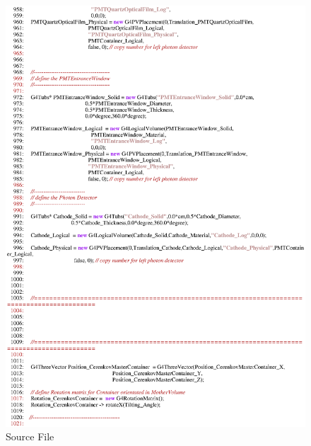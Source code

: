 \begin{figure}[ht]
  \hspace{0cm}
  \includegraphics[scale=0.8]{./figures5/QweakSimCerenkovDetector.cc-p16.eps}
  \caption{\label{SourceV16} Source File}
           \label{fig:V-SC-20}
\end{figure}
\clearpage


